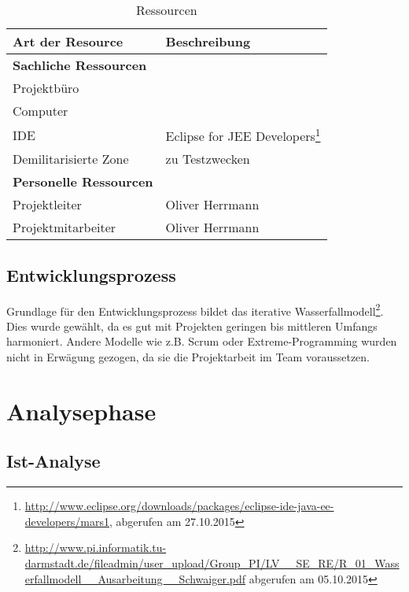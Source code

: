 \documentclass[12pt, xcolor=dvipsnames]{scrartcl}
\begin{document}
\begin{savenotes}
\begin{table}[H]
	\centering
	\begin{tabular}{ll}

		\rowcolor{white!15}				
		\textbf{Art der Resource} & \textbf{Beschreibung} \\\hline		
		
		\rowcolor{MidnightBlue!15}				
		\textbf{Sachliche Ressourcen} & \\
		Projektbüro & \\
		Computer & \\
		\hspace{1.5em} IDE & Eclipse for JEE Developers\footnote{\url{http://www.eclipse.org/downloads/packages/eclipse-ide-java-ee-developers/mars1}, abgerufen am 27.10.2015} \\
		Demilitarisierte Zone & zu Testzwecken \\
		
		\rowcolor{MidnightBlue!15}			
		\textbf{Personelle Ressourcen} & \\
		Projektleiter & Oliver Herrmann \\
		Projektmitarbeiter & Oliver Herrmann \\
	
			    
	\end{tabular}
	\caption{Ressourcen}
	\label{tab:ressourcen}
\end{table}
\end{savenotes}

\subsection{Entwicklungsprozess}

Grundlage für den Entwicklungsprozess bildet das iterative
Wasserfallmodell\footnote{\url{http://www.pi.informatik.tu-darmstadt.de/fileadmin/user_upload/Group_PI/LV__SE_RE/R_01_Wasserfallmodell__Ausarbeitung__Schwaiger.pdf} abgerufen am 05.10.2015}.
Dies wurde gewählt, da es gut mit Projekten geringen bis mittleren Umfangs harmoniert. Andere Modelle wie z.B. Scrum oder Extreme-Programming wurden nicht in Erwägung gezogen, da sie die Projektarbeit im Team voraussetzen.

\section{Analysephase}

\subsection{Ist-Analyse}
\end{document}
